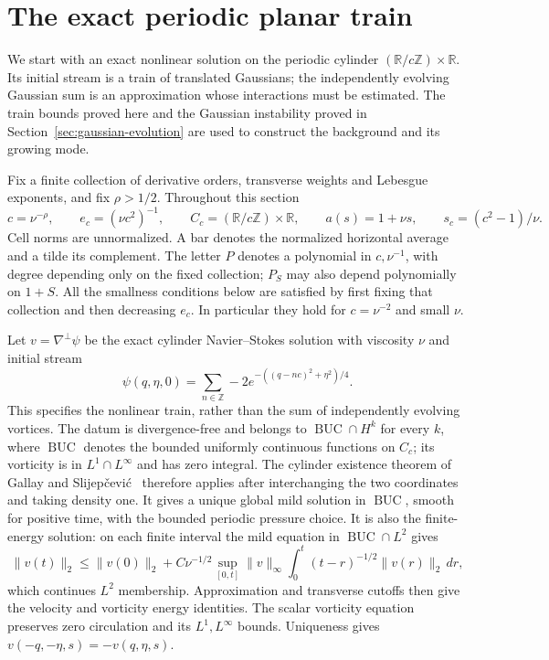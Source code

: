 \section{The exact periodic planar train}
\label{sct:section}

We start with an exact nonlinear solution on the periodic cylinder
$(\mathbb R/c\mathbb Z)\times\mathbb R$. Its initial stream is a train
of translated Gaussians; the independently evolving Gaussian sum is an
approximation whose interactions must be estimated. The train bounds proved here and the Gaussian instability proved in
Section~\ref{sec:gaussian-evolution} are used to construct the background
and its growing mode.

Fix a finite collection of derivative orders, transverse weights and
Lebesgue exponents, and fix $\rho>1/2$. Throughout this section
\[
 c=\nu^{-\rho},\qquad e_c=(\nu c^2)^{-1},\qquad
 C_c=(\mathbb R/c\mathbb Z)\times\mathbb R,
 \qquad a(s)=1+\nu s,\qquad s_c=(c^2-1)/\nu.
\]
Cell norms are unnormalized. A bar denotes the normalized horizontal
average and a tilde its complement. The letter $P$ denotes a polynomial
in $c,\nu^{-1}$, with degree depending only on the fixed collection;
$P_S$ may also depend polynomially on $1+S$. All the smallness
conditions below are satisfied by first fixing that collection and then
decreasing $e_c$. In particular they hold for $c=\nu^{-2}$ and small $\nu$.

Let $v=\nabla^\perp\psi$ be the exact cylinder Navier--Stokes solution
with viscosity $\nu$ and initial stream
\[
 \psi(q,\eta,0)=\sum_{n\in\mathbb Z}-2
                  e^{-((q-nc)^2+\eta^2)/4}.
\]
This specifies the nonlinear train, rather than the sum of independently
evolving vortices. The datum is divergence-free and belongs to
$\operatorname{BUC}\cap H^k$ for every $k$, where $\operatorname{BUC}$
denotes the bounded uniformly continuous functions on $C_c$; its vorticity is in
$L^1\cap L^\infty$ and has zero integral. The cylinder existence theorem
of Gallay and Slijep\v cevi\'c~\cite{gallay-slijepcevic2015} therefore
applies after interchanging the two coordinates and taking density one.
It gives a unique global mild solution in $\operatorname{BUC}$, smooth for positive
time, with the bounded periodic pressure choice.
It is also the finite-energy solution: on each finite interval the mild
equation in $\operatorname{BUC}\cap L^2$ gives
\[
 \|v(t)\|_2\leq\|v(0)\|_2+
 C\nu^{-1/2}\sup_{[0,t]}\|v\|_\infty
       \int_0^t(t-r)^{-1/2}\|v(r)\|_2\,dr,
\]
which continues $L^2$ membership. Approximation and transverse cutoffs
then give the velocity and vorticity energy identities. The scalar
vorticity equation preserves zero circulation and its $L^1,L^\infty$
bounds. Uniqueness gives $v(-q,-\eta,s)=-v(q,\eta,s)$.

